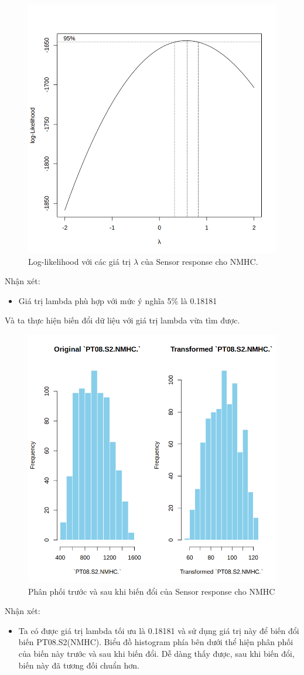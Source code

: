 \begin{figure}[H]
    \centering
    \includegraphics[width=0.75\columnwidth]{air_figures/PT08.S2(NMHC)_optimal_lambda.png}
    \caption{Log-likelihood với các giá trị $\lambda$ của Sensor response cho NMHC.}
    \label{fig:srnmhc_optimal_lambda}
\end{figure}
Nhận xét:
\begin{itemize}
    \item Giá trị lambda phù hợp với mức ý nghĩa 5\% là 0.18181
\end{itemize}

Và ta thực hiện biến đổi dữ liệu với giá trị lambda vừa tìm được.
\begin{figure}[H]
    \centering
    \includegraphics[width=0.75\columnwidth]{air_figures/PT08.S2(NMHC)_transformed_distribution.png}
    \caption{Phân phối trước và sau khi biến đổi của Sensor response cho NMHC}
    \label{fig:srnmhc_transformed_distribution}
\end{figure}
Nhận xét:
\begin{itemize}
    \item Ta có được giá trị lambda tối ưu là 0.18181 và sử dụng giá trị này để biến đổi biến PT08.S2(NMHC). Biểu đồ histogram phía bên dưới thể hiện phân phối của biến này trước và sau khi biến đổi. Dễ dàng thấy được, sau khi biến đổi, biến này đã tương đối chuẩn hơn.
\end{itemize}


